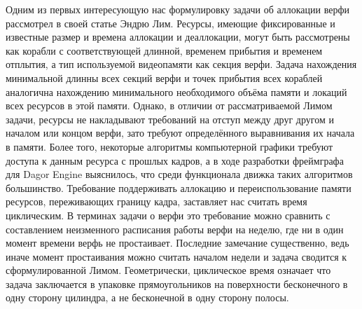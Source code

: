 Одним из первых интересующую нас формулировку задачи об аллокации верфи рассмотрел в своей статье Эндрю Лим\cite{LIM1998105}. Ресурсы, имеющие фиксированные и известные размер и времена аллокации и деаллокации, могут быть рассмотрены как корабли с соответствующей длинной, временем прибытия и временем отплытия, а тип используемой видеопамяти как секция верфи. Задача нахождения минимальной длинны всех секций верфи и точек прибытия всех кораблей аналогична нахождению минимального необходимого объёма памяти и локаций всех ресурсов в этой памяти. Однако, в отличии от рассматриваемой Лимом задачи, ресурсы не накладывают требований на отступ между друг другом и началом или концом верфи, зато требуют определённого выравнивания их начала в памяти. Более того, некоторые алгоритмы компьютерной графики требуют доступа к данным ресурса с прошлых кадров, а в ходе разработки фреймграфа для Dagor Engine выяснилось, что среди функционала движка таких алгоритмов большинство. Требование поддерживать аллокацию и переиспользование памяти ресурсов, переживающих границу кадра, заставляет нас считать время циклическим. В терминах задачи о верфи это требование можно сравнить с составлением неизменного расписания работы верфи на неделю, где ни в один момент времени верфь не простаивает. Последние замечание существенно, ведь иначе момент простаивания можно считать началом недели и задача сводится к сформулированной Лимом. Геометрически, циклическое время означает что задача заключается в упаковке прямоугольников на поверхности бесконечного в одну сторону цилиндра, а не бесконечной в одну сторону полосы.


